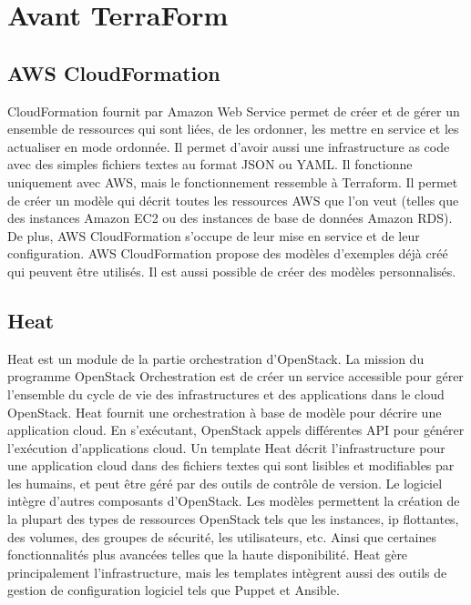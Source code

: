 \documentclass[]{article}
\begin{document}
\newpage
\section{Avant TerraForm}\label{avant-terraform}

\subsection{AWS CloudFormation}\label{aws-cloudformation}

CloudFormation fournit par Amazon Web Service permet de créer et de
gérer un ensemble de ressources qui sont liées, de les ordonner, les
mettre en service et les actualiser en mode ordonnée. Il permet d'avoir
aussi une infrastructure as code avec des simples fichiers textes au
format JSON ou YAML. Il fonctionne uniquement avec AWS, mais le
fonctionnement ressemble à Terraform. Il permet de créer un modèle qui
décrit toutes les ressources AWS que l'on veut (telles que des instances
Amazon EC2 ou des instances de base de données Amazon RDS). De plus, AWS
CloudFormation s'occupe de leur mise en service et de leur
configuration. AWS CloudFormation propose des modèles d'exemples déjà
créé qui peuvent être utilisés. Il est aussi possible de créer des
modèles personnalisés.

\subsection{Heat}\label{heat}

Heat est un module de la partie orchestration d'OpenStack. La mission du
programme OpenStack Orchestration est de créer un service accessible
pour gérer l'ensemble du cycle de vie des infrastructures et des
applications dans le cloud OpenStack. Heat fournit une orchestration à
base de modèle pour décrire une application cloud. En s'exécutant,
OpenStack appels différentes API pour générer l'exécution d'applications
cloud. Un template Heat décrit l'infrastructure pour une application
cloud dans des fichiers textes qui sont lisibles et modifiables par les
humains, et peut être géré par des outils de contrôle de version. Le
logiciel intègre d'autres composants d'OpenStack. Les modèles permettent
la création de la plupart des types de ressources OpenStack tels que les
instances, ip flottantes, des volumes, des groupes de sécurité, les
utilisateurs, etc. Ainsi que certaines fonctionnalités plus avancées
telles que la haute disponibilité. Heat gère principalement
l'infrastructure, mais les templates intègrent aussi des outils de
gestion de configuration logiciel tels que Puppet et Ansible.
\end{document}

